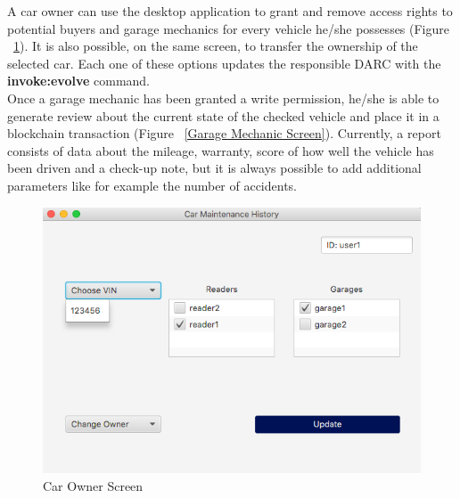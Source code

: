 \newline
A car owner can use the desktop application to grant and remove access rights to potential buyers and garage mechanics for every vehicle he/she possesses (Figure ~\ref{Car Owner Screen}). It is also possible, on the same screen, to transfer the ownership of the selected car. Each one of these options updates the responsible DARC with the \textbf{invoke:evolve} command.\\
\newline
Once a garage mechanic has been granted a write permission, he/she is able to generate review about the current state of the checked vehicle and place it in a blockchain transaction (Figure ~\ref{Garage Mechanic Screen}).
\newline
Currently, a report consists of data about the mileage, warranty, score of how well the vehicle has been driven and a check-up note, but it is always possible to add additional parameters like for example the number of accidents.
\begin{figure}[H]
    \centering
    \includegraphics[width=1\textwidth]{Figures/DesktopApp/userScreen.png}
    \vspace{-15pt}
    \caption{Car Owner Screen}
    \label{Car Owner Screen}
\end{figure}

